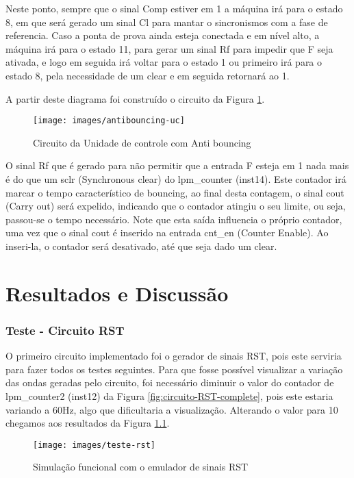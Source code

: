 \documentclass[12pt,a4paper,openany]{abntex2}
\begin{document}
Neste ponto, sempre que o sinal Comp estiver em 1 a máquina irá para o estado 8, em que será gerado um sinal Cl para mantar o sincronismos com a fase de referencia. Caso a ponta de prova ainda esteja conectada e em nível alto, a máquina irá para o estado 11, para gerar um sinal Rf para impedir que F seja ativada, e logo em seguida irá voltar para o estado 1 ou primeiro irá para o estado 8, pela necessidade de um clear e em seguida retornará ao 1.

A partir deste diagrama foi construído o circuito da Figura \ref{fig:antibouncing-uc}.

\begin{figure}[!htp]
	\centering
	\caption{Circuito da Unidade de controle com Anti bouncing}
	\texttt{[image: images/antibouncing-uc]}	\label{fig:antibouncing-uc}
\end{figure}

O sinal Rf que é gerado para não permitir que a entrada F esteja em 1 nada mais é do que um sclr (Synchronous clear) do lpm\_counter (inst14). Este contador irá marcar o tempo característico de bouncing, ao final desta contagem, o sinal cout (Carry out) será expelido, indicando que o contador atingiu o seu limite, ou seja, passou-se o tempo necessário. Note que esta saída influencia o próprio contador, uma vez que o sinal cout é inserido na entrada cnt\_en (Counter Enable). Ao inseri-la, o contador será desativado, até que seja dado um clear.

\chapter{Resultados e Discussão}

\subsection{Teste - Circuito RST}

O primeiro circuito implementado foi o gerador de sinais RST, pois este serviria para fazer todos os testes seguintes. Para que fosse possível visualizar a variação das ondas geradas pelo circuito, foi necessário diminuir o valor do contador de lpm\_counter2 (inst12) da Figura \ref{fig:circuito-RST-complete}, pois este estaria variando a 60Hz, algo que dificultaria a visualização. Alterando o valor para 10 chegamos aos resultados da Figura \ref{fig:teste-rst}.

\begin{figure}[!htp]
	\centering
	\caption{Simulação funcional com o emulador de sinais RST}
	\texttt{[image: images/teste-rst]}	\label{fig:teste-rst}
\end{figure}
\end{document}
